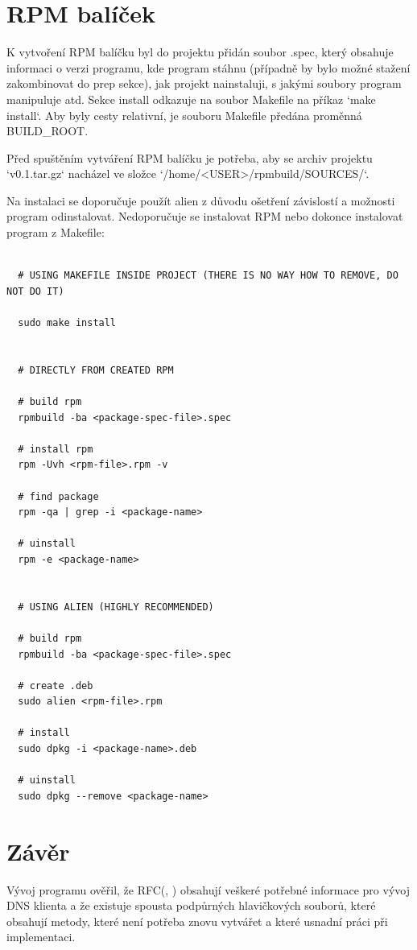 \documentclass[a4paper,11pt]{article}
\begin{document}
\newpage

\section{RPM balíček}

K vytvoření RPM balíčku byl do projektu přidán soubor .spec, který obsahuje informaci o verzi programu, kde program stáhnu (případně by bylo možné stažení zakombinovat do prep sekce), jak projekt nainstaluji, s jakými soubory program manipuluje atd. Sekce install odkazuje na soubor Makefile na příkaz `make install`. Aby byly cesty relativní, je souboru Makefile předána proměnná BUILD\_ROOT.

Před spuštěním vytváření RPM balíčku je potřeba, aby se archiv projektu `v0.1.tar.gz` nacházel ve složce `/home/<USER>/rpmbuild/SOURCES/`.

Na instalaci se doporučuje použít alien z důvodu ošetření závislostí a možnosti program odinstalovat. Nedoporučuje se instalovat RPM nebo dokonce instalovat program z Makefile:

  \lstset{language=Bash}
  \begin{lstlisting}[frame=single,breaklines]

  # USING MAKEFILE INSIDE PROJECT (THERE IS NO WAY HOW TO REMOVE, DO NOT DO IT)

  sudo make install


  # DIRECTLY FROM CREATED RPM

  # build rpm
  rpmbuild -ba <package-spec-file>.spec

  # install rpm
  rpm -Uvh <rpm-file>.rpm -v

  # find package
  rpm -qa | grep -i <package-name>

  # uinstall
  rpm -e <package-name>


  # USING ALIEN (HIGHLY RECOMMENDED)

  # build rpm
  rpmbuild -ba <package-spec-file>.spec

  # create .deb
  sudo alien <rpm-file>.rpm

  # install
  sudo dpkg -i <package-name>.deb

  # uinstall
  sudo dpkg --remove <package-name>

\end{lstlisting}

\section{Závěr}

Vývoj programu ověřil, že RFC(\cite{rfc10135}, \cite{rfc13596}) obsahují veškeré potřebné informace pro vývoj DNS klienta a že existuje spousta podpůrných hlavičkových souborů, které obsahují metody, které není potřeba znovu vytvářet a které usnadní práci při implementaci.

\newpage




\end{document}
